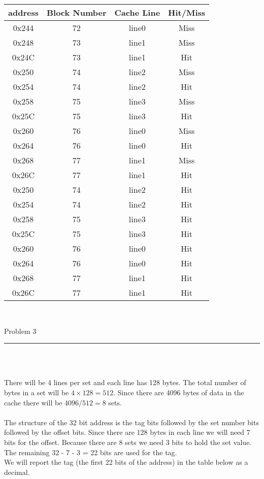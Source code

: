 \documentclass[11pt,reqno]{article}
\begin{document}
\begin{tabular}{| c | c | c | c |}
\hline
address & Block Number & Cache Line & Hit/Miss \\ \hline
0x244 & 72 & line0 & Miss \\ \hline
0x248 & 73 & line1 & Miss \\ \hline
0x24C & 73 & line1 & Hit \\ \hline
0x250 & 74 & line2 & Miss \\ \hline
0x254 & 74 & line2 & Hit \\ \hline
0x258 & 75 & line3 & Miss \\ \hline
0x25C & 75 & line3 & Hit \\ \hline
0x260 & 76 & line0 & Miss \\ \hline
0x264 & 76 & line0 & Hit \\ \hline
0x268 & 77 & line1 & Miss \\ \hline
0x26C & 77 & line1 & Hit \\ \hline
0x250 & 74 & line2 & Hit \\ \hline
0x254 & 74 & line2 & Hit \\ \hline
0x258 & 75 & line3 & Hit \\ \hline
0x25C & 75 & line3 & Hit \\ \hline
0x260 & 76 & line0 & Hit \\ \hline
0x264 & 76 & line0 & Hit \\ \hline
0x268 & 77 & line1& Hit \\ \hline
0x26C & 77 & line1 & Hit \\ \hline
\end{tabular}\\
\newpage 

\begin{flushleft} 
Problem 3 \\
\rule{500pt}{1pt}\\
\end{flushleft} 

\noindent{}\\ 

There will be 4 lines per set and each line has 128 bytes. The total number of bytes in a set will be $4 \times 128 = 512$. Since there are 4096 bytes of data in the cache there will be $4096/512 = 8$ sets.\\

\noindent{}\\ 

The structure of the 32 bit address is the tag bits followed by the set number bits followed by the offset bits. Since there are 128 bytes in each line we will need 7 bits for the offset. Because there are 8 sets we need 3 bits to hold the set value. The remaining 32 - 7 - 3 = 22 bits are used for the tag.\\
We will report the tag (the first 22 bits of the address) in the table below as a decimal.\\
\end{document}
